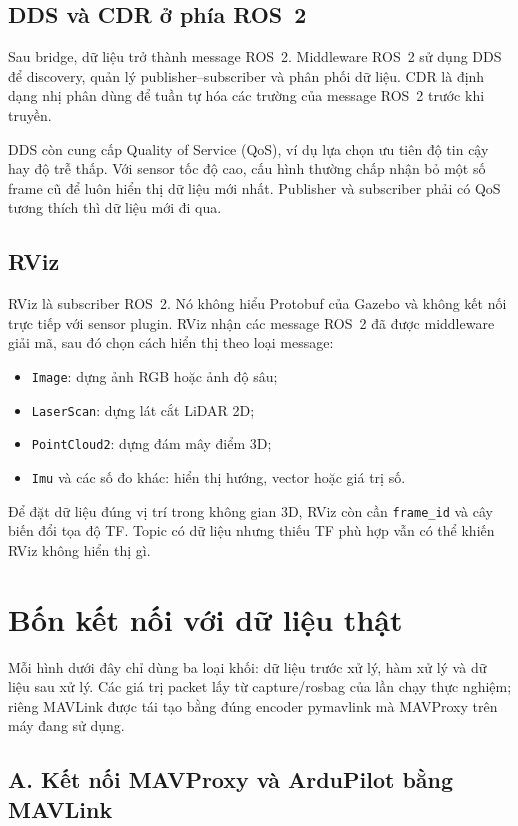 \documentclass[a4paper]{article}
\begin{document}
\subsection{DDS và CDR ở phía ROS~2}

Sau bridge, dữ liệu trở thành message ROS~2. Middleware ROS~2 sử dụng DDS để discovery, quản lý publisher--subscriber và phân phối dữ liệu. CDR là định dạng nhị phân dùng để tuần tự hóa các trường của message ROS~2 trước khi truyền.

DDS còn cung cấp Quality of Service (QoS), ví dụ lựa chọn ưu tiên độ tin cậy hay độ trễ thấp. Với sensor tốc độ cao, cấu hình thường chấp nhận bỏ một số frame cũ để luôn hiển thị dữ liệu mới nhất. Publisher và subscriber phải có QoS tương thích thì dữ liệu mới đi qua.

\subsection{RViz}

RViz là subscriber ROS~2. Nó không hiểu Protobuf của Gazebo và không kết nối trực tiếp với sensor plugin. RViz nhận các message ROS~2 đã được middleware giải mã, sau đó chọn cách hiển thị theo loại message:

\begin{itemize}
  \item \texttt{Image}: dựng ảnh RGB hoặc ảnh độ sâu;
  \item \texttt{LaserScan}: dựng lát cắt LiDAR 2D;
  \item \texttt{PointCloud2}: dựng đám mây điểm 3D;
  \item \texttt{Imu} và các số đo khác: hiển thị hướng, vector hoặc giá trị số.
\end{itemize}

Để đặt dữ liệu đúng vị trí trong không gian 3D, RViz còn cần \texttt{frame\_id} và cây biến đổi tọa độ TF. Topic có dữ liệu nhưng thiếu TF phù hợp vẫn có thể khiến RViz không hiển thị gì.

\section{Bốn kết nối với dữ liệu thật}

Mỗi hình dưới đây chỉ dùng ba loại khối: dữ liệu trước xử lý, hàm xử lý và dữ liệu sau xử lý. Các giá trị packet lấy từ capture/rosbag của lần chạy thực nghiệm; riêng MAVLink được tái tạo bằng đúng encoder pymavlink mà MAVProxy trên máy đang sử dụng.

\subsection{A. Kết nối MAVProxy và ArduPilot bằng MAVLink}
\end{document}
